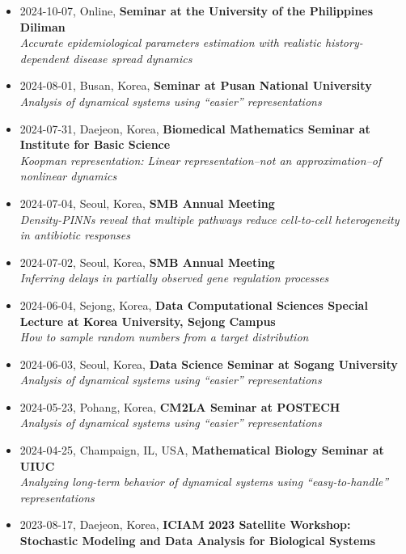 \documentclass[margin,line]{res}
\begin{document}
\begin{resume}
\begin{itemize}[leftmargin=0pt, label={}]
    \textit{Koopman representation: Linear representation of nonlinear dynamics}
    \item 2024-10-07, Online, \textbf{Seminar at the University of the Philippines Diliman} \\
    \textit{Accurate epidemiological parameters estimation with realistic history-dependent disease spread dynamics}
    \item 2024-08-01, Busan, Korea, \textbf{Seminar at Pusan National University} \\
    \textit{Analysis of dynamical systems using ``easier'' representations}
    \item 2024-07-31, Daejeon, Korea, \textbf{Biomedical Mathematics Seminar at Institute for Basic Science} \\
    \textit{Koopman representation: Linear representation--not an approximation--of nonlinear dynamics}
    \item 2024-07-04, Seoul, Korea, \textbf{SMB Annual Meeting} \\
    \textit{Density-PINNs reveal that multiple pathways reduce cell-to-cell heterogeneity in antibiotic responses}
    \item 2024-07-02, Seoul, Korea, \textbf{SMB Annual Meeting} \\
    \textit{Inferring delays in partially observed gene regulation processes}
    \item 2024-06-04, Sejong, Korea, \textbf{Data Computational Sciences Special Lecture at Korea University, Sejong Campus} \\
    \textit{How to sample random numbers from a target distribution}
    \item 2024-06-03, Seoul, Korea, \textbf{Data Science Seminar at Sogang University} \\
    \textit{Analysis of dynamical systems using ``easier'' representations}
    \item 2024-05-23, Pohang, Korea, \textbf{CM2LA Seminar at POSTECH} \\
    \textit{Analysis of dynamical systems using ``easier'' representations}
    \item 2024-04-25, Champaign, IL, USA, \textbf{Mathematical Biology Seminar at UIUC} \\
    \textit{Analyzing long-term behavior of dynamical systems using ``easy-to-handle'' representations}
    \item 2023-08-17, Daejeon, Korea, \textbf{ICIAM 2023 Satellite Workshop: Stochastic Modeling and Data Analysis for Biological Systems} \\

\end{itemize}
\end{resume}
\end{document}
